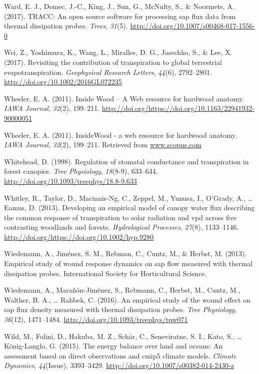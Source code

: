 \documentclass[11pt,twoside]{reedthesis}
\begin{document}
\hypertarget{ref-Ward2017}{}
Ward, E. J., Domec, J.-C., King, J., Sun, G., McNulty, S., \& Noormets,
A. (2017). TRACC: An open source software for processing sap flux data
from thermal dissipation probes. \emph{Trees}, \emph{31}(5).
\url{http://doi.org/10.1007/s00468-017-1556-0}

\hypertarget{ref-Wei2017}{}
Wei, Z., Yoshimura, K., Wang, L., Miralles, D. G., Jasechko, S., \& Lee,
X. (2017). Revisiting the contribution of transpiration to global
terrestrial evapotranspiration. \emph{Geophysical Research Letters},
\emph{44}(6), 2792--2801. \url{http://doi.org/10.1002/2016GL072235}

\hypertarget{ref-insidewood}{}
Wheeler, E. A. (2011). Inside Wood -- A Web resource for hardwood
anatomy. \emph{IAWA Journal}, \emph{32}(2), 199--211.
\url{http://doi.org/https://doi.org/10.1163/22941932-90000051}

\hypertarget{ref-Wheeler2011}{}
Wheeler, E. A. (2011). InsideWood - a web resource for hardwood anatomy.
\emph{IAWA Journal}, \emph{32}(2), 199--211. Retrieved from
\url{www.scopus.com}

\hypertarget{ref-Whitehead1998}{}
Whitehead, D. (1998). Regulation of stomatal conductance and
transpiration in forest canopies. \emph{Tree Physiology},
\emph{18}(8-9), 633--644.
\url{http://doi.org/10.1093/treephys/18.8-9.633}

\hypertarget{ref-Whitley2013}{}
Whitley, R., Taylor, D., Macinnis-Ng, C., Zeppel, M., Yunusa, I.,
O'Grady, A., \ldots{} Eamus, D. (2013). Developing an empirical model of
canopy water flux describing the common response of transpiration to
solar radiation and vpd across five contrasting woodlands and forests.
\emph{Hydrological Processes}, \emph{27}(8), 1133--1146.
\url{http://doi.org/https://doi.org/10.1002/hyp.9280}

\hypertarget{ref-Wiedemann2013}{}
Wiedemann, A., Jiménez, S. M., Rebman, C., Cuntz, M., \& Herbst, M.
(2013). Empirical study of wound response dynamics on sap flow measured
with thermal dissipation probes. International Society for Horticultural
Science.

\hypertarget{ref-Wiedemann2016}{}
Wiedemann, A., Marañón-Jiménez, S., Rebmann, C., Herbst, M., Cuntz, M.,
Walther, B. A., \ldots{} Rahbek, C. (2016). An empirical study of the
wound effect on sap flux density measured with thermal dissipation
probes. \emph{Tree Physiology}, \emph{36}(12), 1471--1484.
\url{http://doi.org/10.1093/treephys/tpw071}

\hypertarget{ref-Wild2015}{}
Wild, M., Folini, D., Hakuba, M. Z., Schär, C., Seneviratne, S. I.,
Kato, S., \ldots{} König-Langlo, G. (2015). The energy balance over land
and oceans: An assessment based on direct observations and cmip5 climate
models. \emph{Climate Dynamics}, \emph{44}(Issue), 3393--3429.
\url{http://doi.org/10.1007/s00382-014-2430-z}
\end{document}
